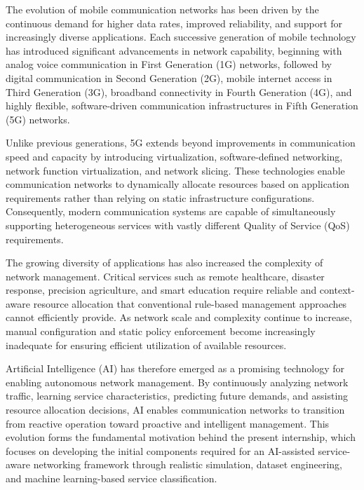 \documentclass[12pt,a4paper]{report}
\begin{document}
	The evolution of mobile communication networks has been driven by the continuous demand for higher data rates, improved reliability, and support for increasingly diverse applications. Each successive generation of mobile technology has introduced significant advancements in network capability, beginning with analog voice communication in First Generation (1G) networks, followed by digital communication in Second Generation (2G), mobile internet access in Third Generation (3G), broadband connectivity in Fourth Generation (4G), and highly flexible, software-driven communication infrastructures in Fifth Generation (5G) networks.
	
	Unlike previous generations, 5G extends beyond improvements in communication speed and capacity by introducing virtualization, software-defined networking, network function virtualization, and network slicing. These technologies enable communication networks to dynamically allocate resources based on application requirements rather than relying on static infrastructure configurations. Consequently, modern communication systems are capable of simultaneously supporting heterogeneous services with vastly different Quality of Service (QoS) requirements.
	
	The growing diversity of applications has also increased the complexity of network management. Critical services such as remote healthcare, disaster response, precision agriculture, and smart education require reliable and context-aware resource allocation that conventional rule-based management approaches cannot efficiently provide. As network scale and complexity continue to increase, manual configuration and static policy enforcement become increasingly inadequate for ensuring efficient utilization of available resources.
	
	Artificial Intelligence (AI) has therefore emerged as a promising technology for enabling autonomous network management. By continuously analyzing network traffic, learning service characteristics, predicting future demands, and assisting resource allocation decisions, AI enables communication networks to transition from reactive operation toward proactive and intelligent management. This evolution forms the fundamental motivation behind the present internship, which focuses on developing the initial components required for an AI-assisted service-aware networking framework through realistic simulation, dataset engineering, and machine learning-based service classification.
	
	
\end{document}
